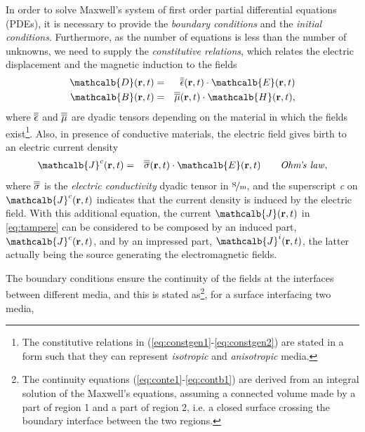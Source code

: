 \par In order to solve Maxwell's system of first order partial differential equations (PDEs), it is necessary to provide the \textit{boundary conditions} and the \textit{initial conditions}. Furthermore, as the number of equations is less than the number of unknowns, we need to supply the \textit{constitutive relations}, which relates the electric displacement and the magnetic induction to the fields
\begin{eqnarray}
\label{eq:constgen1}
\mathcalb{D}(\mathbf{r},t) &= & \dyad{\epsilon}(\mathbf{r},t) \cdot \mathcalb{E}(\mathbf{r},t) \\
\label{eq:constgen2}
\mathcalb{B}(\mathbf{r},t) &= &  \dyad{\mu}(\mathbf{r},t) \cdot \mathcalb{H}(\mathbf{r},t),
\end{eqnarray} 
where $\overline{\overline{\epsilon}}$ and $\overline{\overline{\mu}}$ are dyadic tensors depending on the material in which the fields exist\footnote{The constitutive relations in (\ref{eq:constgen1}-\ref{eq:constgen2}) are stated in a form such that they can represent \textit{isotropic} and \textit{anisotropic} media.}. Also, in presence of conductive materials, the electric field gives birth to an electric current density
\begin{eqnarray}
\mathcalb{J}^c(\mathbf{r},t) &= &\dyad{\sigma}(\mathbf{r},t) \cdot \mathcalb{E}(\mathbf{r},t) \qquad \mathit{Ohm}\textrm{'}\mathit{\!s \ law},
\end{eqnarray}
where $\overline{\overline{\sigma}}$ is the \textit{electric conductivity} dyadic tensor in $\mathrm{\nicefrac{\mathrm S}{\mathrm m}}$, and the superscript \textit{c} on $\mathcalb{J}^c(\mathbf{r},t)$ indicates that the current density is induced by the electric field. With this additional equation, the current $\mathcalb{J}(\mathbf{r},t)$ in \eqref{eq:tampere} can be considered to be composed by an induced part, $\mathcalb{J}^c(\mathbf{r},t)$, and by an impressed part, $\mathcalb{J}^i(\mathbf{r},t)$, the latter actually being the source generating the electromagnetic fields.
\par The boundary conditions ensure the continuity of the fields at the interfaces between different media, and this is stated as\footnote{The continuity equations (\ref{eq:conte1}-\ref{eq:contb1}) are derived from an integral solution of the Maxwell's equations, assuming a connected volume made by a part of region 1 and a part of region 2, i.e. a closed surface crossing the boundary interface between the two regions.}, for a surface interfacing two media,
